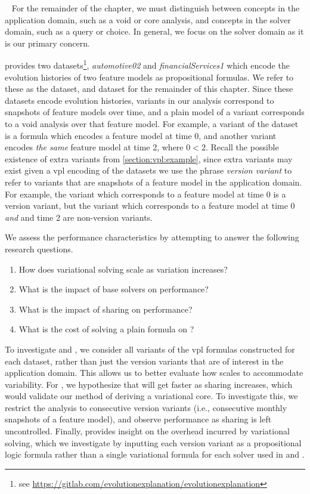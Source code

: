 ~\label{section:case-studies:experimental-methodology}
%
For the remainder of the chapter, we must distinguish between concepts in the
application domain, such as a void or core analysis, and concepts in the solver
domain, such as a query or choice. In general, we focus on the solver domain as
it is our primary concern.

\nieke{} provides two datasets\footnote{see
  \url{https://gitlab.com/evolutionexplanation/evolutionexplanation}},
\textit{automotive02} and \textit{financialServices1} which encode the evolution
histories of two feature models as propositional formulas. We refer to these as
the \auto{} dataset, and \fin{} dataset for the remainder of this chapter. Since
these datasets encode evolution histories, variants in our analysis correspond
to snapshots of feature models over time, and a plain model of a variant
corresponds to a void analysis over that feature model. For example, a variant
of the \auto{} dataset is a \pl{} formula which encodes a feature model at time
0, and another variant encodes \emph{the same} feature model at time 2, where $0
< 2$. Recall the possible existence of extra variants from
\autoref{section:vpl:example}, since extra variants may exist given a \ac{vpl}
encoding of the datasets we use the phrase \textit{version variant} to refer to
variants that are snapshots of a feature model in the application domain. For
example, the variant which corresponds to a feature model at time 0 is a version
variant, but the variant which corresponds to a feature model at time 0
\emph{and} and time 2 are non-version variants.

We assess the performance characteristics \vsat{} by attempting to answer the
following research questions.
%
\begin{enumerate}%
\item[\resQ{1}] How does variational solving scale as variation increases?
\item[\resQ{2}] What is the impact of base solvers on performance?
\item[\resQ{3}] What is the impact of sharing on performance?
\item[\resQ{4}] What is the cost of solving a plain formula on \vsat{}?
\end{enumerate}

To investigate  and , we consider all variants of the \ac{vpl}
formulas constructed for each dataset, rather than just the version variants
that are of interest in the application domain. This allows us to better
evaluate how \vsat{} scales to accommodate variability.
%
For , we hypothesize that \vsat{} will get faster as sharing increases,
which would validate our method of deriving a variational core. To investigate
this, we restrict the analysis to consecutive version variants (i.e.,
consecutive monthly snapshots of a feature model), and observe performance
as sharing is left uncontrolled.
%
Finally,  provides insight on the overhead incurred by variational
solving, which we investigate by inputting each version variant as a
propositional logic formula rather than a single variational formula for each
solver used in  and .

